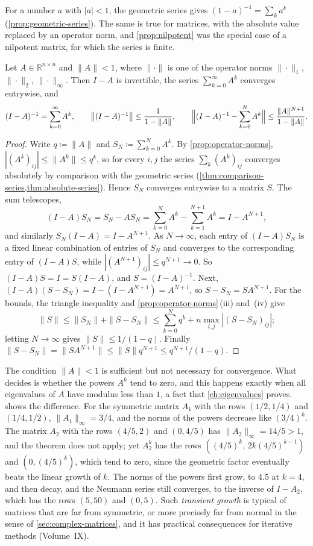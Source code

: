 For a number $a$ with $|a|<1$, the geometric series gives $(1-a)^{-1}=\sum_ka^k$ (\cref{prop:geometric-series}). The same is true for matrices, with the absolute value replaced by an operator norm, and \cref{prop:nilpotent} was the special case of a nilpotent matrix, for which the series is finite.

\begin{theorem}
\label{thm:neumann}
Let $A\in\mathbb R^{n\times n}$ and $\|A\|<1$, where $\|\cdot\|$ is one of the operator norms $\|\cdot\|_1$, $\|\cdot\|_2$, $\|\cdot\|_\infty$. Then $I-A$ is invertible, the series $\sum_{k=0}^\infty A^k$ converges entrywise, and
\[
(I-A)^{-1}=\sum_{k=0}^\infty A^k,\qquad\bigl\|(I-A)^{-1}\bigr\|\le\frac1{1-\|A\|},\qquad\Bigl\|(I-A)^{-1}-\sum_{k=0}^NA^k\Bigr\|\le\frac{\|A\|^{N+1}}{1-\|A\|}.
\]
\end{theorem}

\begin{proof}
Write $q\coloneqq\|A\|$ and $S_N\coloneqq\sum_{k=0}^NA^k$. By \cref{prop:operator-norms}, $|(A^k)_{ij}|\le\|A^k\|\le q^k$, so for every $i,j$ the series $\sum_k(A^k)_{ij}$ converges absolutely by comparison with the geometric series (\cref{thm:comparison-series,thm:absolute-series}). Hence $S_N$ converges entrywise to a matrix $S$. The sum telescopes,
\[
(I-A)S_N=S_N-AS_N=\sum_{k=0}^NA^k-\sum_{k=1}^{N+1}A^k=I-A^{N+1},
\]
and similarly $S_N(I-A)=I-A^{N+1}$. As $N\to\infty$, each entry of $(I-A)S_N$ is a fixed linear combination of entries of $S_N$ and converges to the corresponding entry of $(I-A)S$, while $|(A^{N+1})_{ij}|\le q^{N+1}\to0$. So $(I-A)S=I=S(I-A)$, and $S=(I-A)^{-1}$. Next, $(I-A)(S-S_N)=I-(I-A^{N+1})=A^{N+1}$, so $S-S_N=SA^{N+1}$. For the bounds, the triangle inequality and \cref{prop:operator-norms}\,(iii) and~(iv) give
\[
\|S\|\le\|S_N\|+\|S-S_N\|\le\sum_{k=0}^Nq^k+n\max_{i,j}|(S-S_N)_{ij}| ;
\]
letting $N\to\infty$ gives $\|S\|\le1/(1-q)$. Finally $\|S-S_N\|=\|SA^{N+1}\|\le\|S\|q^{N+1}\le q^{N+1}/(1-q)$.
\end{proof}

The condition $\|A\|<1$ is sufficient but not necessary for convergence. What decides is whether the powers $A^k$ tend to zero, and this happens exactly when all eigenvalues of $A$ have modulus less than $1$, a fact that \cref{ch:eigenvalues} proves.  shows the difference. For the symmetric matrix $A_1$ with the rows $(1/2,1/4)$ and $(1/4,1/2)$, $\|A_1\|_\infty=3/4$, and the norms of the powers decrease like $(3/4)^k$. The matrix $A_2$ with the rows $(4/5,2)$ and $(0,4/5)$ has $\|A_2\|_\infty=14/5>1$, and the theorem does not apply; yet $A_2^k$ has the rows $((4/5)^k,\,2k(4/5)^{k-1})$ and $(0,(4/5)^k)$, which tend to zero, since the geometric factor eventually beats the linear growth of $k$. The norms of the powers first grow, to $4.5$ at $k=4$, and then decay, and the Neumann series still converges, to the inverse of $I-A_2$, which has the rows $(5,50)$ and $(0,5)$. Such \emph{transient growth} is typical of matrices that are far from symmetric, or more precisely far from normal in the sense of \cref{sec:complex-matrices}, and it has practical consequences for iterative methods (Volume~IX).

